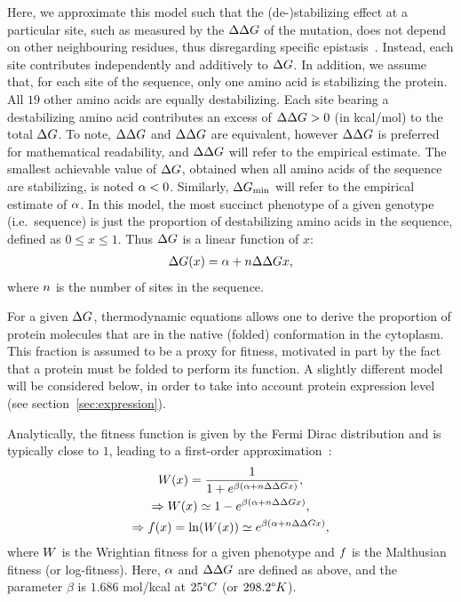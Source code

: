 Here, we approximate this model such that the (de-)stabilizing effect at a particular site, such as measured by the $\Delta \Delta G$ of the mutation, does not depend on other neighbouring residues, thus disregarding specific epistasis~\citep{Dasmeh2014}.
Instead, each site contributes independently and additively to $\Delta G$.
In addition, we assume that, for each site of the sequence, only one amino acid is stabilizing the protein.
All $19$ other amino acids are equally destabilizing.
Each site bearing a destabilizing amino acid contributes an excess of $\Delta \Delta G > 0$ (in kcal/mol) to the total $\Delta G$.
To note, $\Delta \Delta G$ and $\Delta \Delta G$ are equivalent, however $\Delta \Delta G$ is preferred for mathematical readability, and $\Delta \Delta G$ will refer to the empirical estimate.
The smallest achievable value of $\Delta G$, obtained when all amino acids of the sequence are stabilizing, is noted $ \alpha < 0$.
Similarly, $\Delta G_{\text{min}}$ will refer to the empirical estimate of $\alpha$.
In this model, the most succinct \gls{phenotype} of a given genotype (i.e.~sequence) is just the proportion of destabilizing amino acids in the sequence, defined as $0 \leq x \leq 1$.
Thus $\Delta G$ is a linear function of $x$:
\begin{align}
    \Delta G (x) = \alpha + n \Delta \Delta G x,
\end{align}
where $n$ is the number of sites in the sequence.

For a given $\Delta G$, thermodynamic equations allows one to derive the proportion of protein molecules that are in the native (folded) conformation in the cytoplasm.
This fraction is assumed to be a proxy for fitness, motivated in part by the fact that a protein must be folded to perform its function.
A slightly different model will be considered below, in order to take into account protein expression level (see section~\ref{sec:expression}).

Analytically, the fitness function is given by the Fermi Dirac distribution and is typically close to $1$, leading to a first-order approximation~\citep{Goldstein2011}:
\begin{gather}
    W (x) = \dfrac{1}{1 + e^{\beta (\alpha + n \Delta \Delta G x)}},\\
    \Rightarrow W (x) \simeq 1 - e^{\beta (\alpha + n \Delta \Delta G x)},\\
    \Rightarrow f (x) = \ln ( W (x) ) \simeq e^{\beta (\alpha + n \Delta \Delta G x)},
\end{gather}
where $W$ is the Wrightian fitness for a given \gls{phenotype} and $f $ is the Malthusian fitness (or log-fitness).
Here, $\alpha$ and $\Delta \Delta G$ are defined as above, and the parameter $\beta$ is $1.686$ mol/kcal at $25 \degree C$ (or $298.2 \degree K$).

